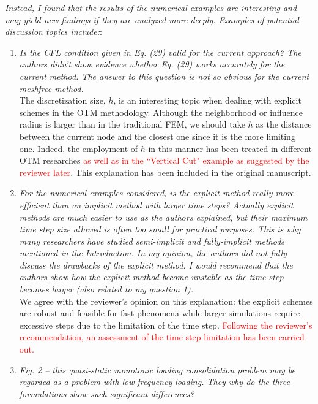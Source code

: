 \documentclass[12pt]{article}
\begin{document}
\textit{Instead, I found that the results of the numerical examples are interesting and may yield new findings if they are analyzed more deeply. Examples of potential discussion topics include:}:

\begin{enumerate}

\item \textit{Is the CFL condition given in Eq. (29) valid for the current approach? The authors didn't show evidence whether Eq. (29) works accurately for the current method. The answer to this question is not so obvious for the current meshfree method.}\\

The discretization size, $h$, is an interesting topic when dealing with explicit schemes in the OTM methodology. Although the neighborhood or influence radius is larger than in the traditional FEM, we should take $h$ as the distance between the current node and the closest one since it is the more limiting one. Indeed, the employment of $h$ in this manner has been treated in different OTM researches \textcolor{red}{as well as in the ``Vertical Cut" example as suggested by the reviewer later}. This explanation has been included in the original manuscript.


\item \textit{For the numerical examples considered, is the explicit method really more efficient than an implicit method with larger time steps? Actually explicit methods are much easier to use as the authors explained, but their maximum time step size allowed is often too small for practical purposes. This is why many researchers have studied semi-implicit and fully-implicit methods mentioned in the Introduction. In my opinion, the authors did not fully discuss the drawbacks of the explicit method. I would recommend that the authors show how the explicit method become unstable as the time step becomes larger (also related to my question 1).}\\

We agree with the reviewer's opinion on this explanation: the explicit schemes are robust and feasible for fast phenomena while larger simulations require excessive steps due to the limitation of the time step. \textcolor{red}{Following the reviewer's recommendation, an assessment of the time step limitation has been carried out.}


\item \textit{Fig. 2 -- this quasi-static monotonic loading consolidation problem may be regarded as a problem with low-frequency loading. They why do the three formulations show such significant differences?}\\


\end{enumerate}
\end{document}

